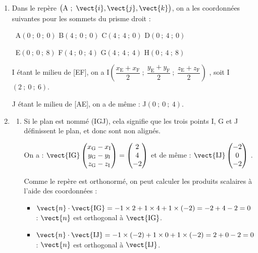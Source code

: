 \begin{enumerate}
\item Dans le repère $\big(\mathrm{A}~;~\vect{i},\vect{j},\vect{k}\big)$, on a les coordonnées suivantes pour les sommets du prisme droit :

	\hfill~A$(0~;~0~;~0)$ \hfill B$ (4~;~0~;~0) $ \hfill C$(4~;~4~;~0)$ \hfill D$(0~;~4~;~0)$\hfill~

	\hfill~E$(0~;~0~;~8)$ \hfill F$ (4~;~0~;~4) $ \hfill G$(4~;~4~;~4)$ \hfill H$(0~;~4~;~8)$\hfill~

	I étant le milieu de [EF], on a I$\left(\dfrac{x_\mathrm{E}+x_\mathrm{F}}{2}~;~\dfrac{y_\mathrm{E}+y_\mathrm{F}}{2}~;~\dfrac{z_\mathrm{E}+z_\mathrm{F}}{2}\right)$
	, soit I$(2~;~0~;~6)$.

	J étant le milieu de [AE], on a de même : J$(0~;~0~;~4)$.

\item 
	\begin{enumerate}
		\item Si le plan est nommé (IGJ), cela signifie que les trois points I, G et J définissent le plan, et donc sont non alignés.

		On a : $\vect{\mathrm{IG}}\begin{pmatrix} x_\mathrm{G}-x_\mathrm{I}\\y_\mathrm{G}-y_\mathrm{I}\\z_\mathrm{G}-z_\mathrm{I} \end{pmatrix} = \begin{pmatrix} 2\\4\\-2\end{pmatrix}$ \quad et de même : $\vect{\mathrm{IJ}} \begin{pmatrix} -2\\0\\-2\end{pmatrix}$ .

		Comme le repère est orthonormé, on peut calculer les produits scalaires à l'aide des coordonnées :

\begin{itemize}
\item $ \vect{n}\cdot \vect{\mathrm{IG}} = -1\times 2 + 1 \times 4 + 1 \times (-2) = -2 + 4-2 = 0$ : $\vect{n}$ est orthogonal à $ \vect{\mathrm{IG}} $.
\item $ \vect{n}\cdot \vect{\mathrm{IJ}} = -1\times (-2) + 1 \times 0 + 1\times (-2) = 2 + 0-2 = 0$ : $\vect{n}$ est orthogonal à $ \vect{\mathrm{IJ}} $.
\end{itemize}


\end{enumerate}
\end{enumerate}
